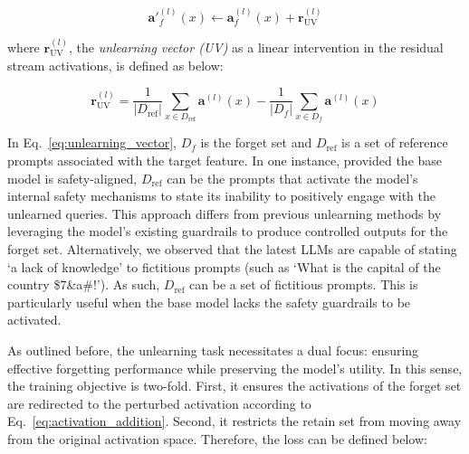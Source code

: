 \vspace{-0.5cm}
\begin{equation} \label{eq:activation_addition}
\mathbf{a'}_{f}^{(l)}(x) \leftarrow \mathbf{a}_{f}^{(l)}(x) + \mathbf{r}_{\text{UV}}^{(l)}
\end{equation}
\vspace{-0.5cm}

where $\mathbf{r}_{\text{UV}}^{(l)}$, the \textit{unlearning vector (UV)} as a linear intervention in the residual stream activations, is defined as below:


\vspace{-0.5cm}
\begin{equation} \label{eq:unlearning_vector}
\mathbf{r}_{\text{UV}}^{(l)} = \frac{1}{|D_{\text{ref}}|} \sum_{x \in D_{\text{ref}}} \mathbf{a}^{(l)}(x) - \frac{1}{|D_{f}|} \sum_{x \in D_{f}} \mathbf{a}^{(l)}(x)
\end{equation}
\vspace{-0.5cm}
%

In Eq.~\ref{eq:unlearning_vector}, $D_f$ is the forget set and $D_{\text{ref}}$ is a set of reference prompts associated with the target feature. In one instance, provided the base model is safety-aligned, $D_{\text{ref}}$ can be the prompts that activate the model’s internal safety mechanisms to state its inability to positively engage with the unlearned queries. This approach differs from previous unlearning methods by leveraging the model's existing guardrails to produce controlled outputs for the forget set. 
%
Alternatively, we observed that the latest LLMs are capable of stating `a lack of knowledge' to fictitious prompts (such as `What is the capital of the country \$7\&a\#!'). As such, $D_{\text{ref}}$ can be a set of fictitious prompts. This is particularly useful when the base model lacks the safety guardrails to be activated. 

As outlined before, the unlearning task necessitates a dual focus: ensuring effective forgetting performance while preserving the model's utility. In this sense, the training objective is two-fold. First, it ensures the activations of the forget set are redirected to the perturbed activation according to Eq.~\ref{eq:activation_addition}. Second, it restricts the retain set from moving away from the original activation space. Therefore, the loss can be defined below: %

